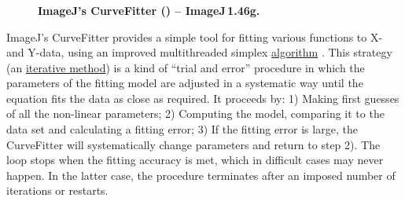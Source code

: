

\subsubsection[\protect\userinterface{Curve Fitting\ldots{}}]{\protect{}\label{sub:Curve-Fitting...}}

\begin{figure}[h]
\caption[CurveFitter]{\textbf{\label{fig:CurveFitter}ImageJ's CurveFitter (\protect{})
-- ImageJ\,1.46g.}}
\end{figure}
ImageJ's CurveFitter provides a simple tool for fitting various functions
to X- and Y-data, using an improved multithreaded simplex
\href{http://en.wikipedia.org/wiki/Nelder-Mead_method}{algorithm}
{\small \cite{C-CurveFitter}}. This strategy (an \href{http://en.wikipedia.org/wiki/Iterative_method}{iterative method})
is a kind of ``trial and error'' procedure in which the parameters
of the fitting model are adjusted in a systematic way until the equation
fits the data as close as required. It proceeds by: 1) Making first
guesses of all the non-linear parameters; 2) Computing the model,
comparing it to the data set and calculating a fitting error; 3) If
the fitting error is large, the CurveFitter will systematically change
parameters and return to step 2). The loop stops when the fitting
accuracy is met, which in difficult cases may never happen. In the
latter case, the procedure terminates after an imposed number of iterations
or restarts. 


